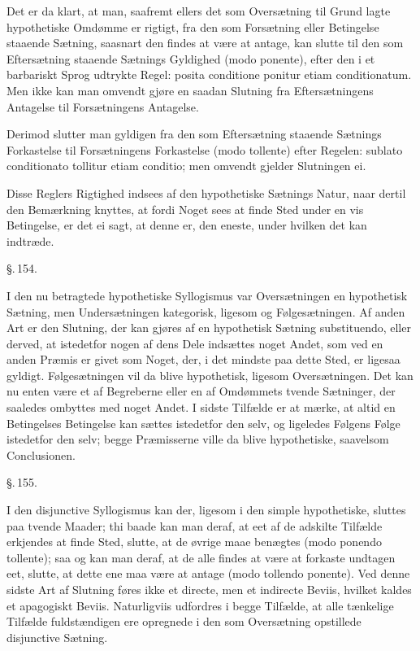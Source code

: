 \documentclass[12pt]{book}
\def\textit#1{#1}%
\newcommand{\parag}[1]{%
  \par\vspace{0.9\baselineskip}%
  {\centering\textit{\S.\,#1.}\par}%
  \vspace{0.35\baselineskip}%
  \noindent\hspace{\parindent}\ignorespaces
}
\newcommand{\opage}[1]{\marginnote{\footnotesize\textit{[#1]}}}
\begin{document}
Det er da klart, at man, saafremt ellers det som Oversætning til Grund lagte
hypothetiske Omdømme er rigtigt, fra den som Forsætning eller Betingelse
staaende Sætning, saasnart den findes at være at antage, kan slutte til den som
Eftersætning staaende Sætnings Gyldighed (\textit{modo ponente}), efter den i
et barbariskt Sprog
\opage{346} udtrykte Regel: \textit{posita conditione ponitur etiam conditionatum}. Men
ikke kan man omvendt gjøre en saadan Slutning fra Eftersætningens Antagelse til
Forsætningens Antagelse.

Derimod slutter man gyldigen fra den som Eftersætning staaende Sætnings
Forkastelse til Forsætningens Forkastelse (\textit{modo tollente}) efter
Regelen: \textit{sublato conditionato tollitur etiam conditio}; men omvendt
gjelder Slutningen ei.

Disse Reglers Rigtighed indsees af den hypothetiske Sætnings Natur, naar dertil
den Bemærkning knyttes, at fordi Noget sees at finde Sted under en vis
Betingelse, er det ei sagt, at denne er, den eneste, under hvilken det kan
indtræde.

\parag{154}

I den nu betragtede hypothetiske Syllogismus var Oversætningen en hypothetisk
Sætning, men Undersætningen kategorisk, ligesom og Følgesætningen. Af anden Art
er den Slutning, der kan gjøres af en hypothetisk Sætning
\textit{substituendo}, eller derved, at istedetfor nogen af dens Dele indsættes
noget Andet, som ved en anden Præmis er givet som Noget, der, i det mindste paa
dette Sted, er ligesaa gyldigt. Følgesætningen vil da blive hypothetisk,
ligesom Oversætningen. Det kan nu enten være et af Begreberne eller en af
Omdømmets tvende Sætninger, der saaledes ombyttes med noget Andet. I sidste
Tilfælde er at mærke, at altid en Betingelses Betingelse kan sættes istedetfor
den selv,
\opage{347} og ligeledes Følgens Følge istedetfor den selv; begge Præmisserne ville da
blive hypothetiske, saavelsom Conclusionen.

\parag{155}

I den disjunctive Syllogismus kan der, ligesom i den simple hypothetiske,
sluttes paa tvende Maader; thi baade kan man deraf, at eet af de adskilte
Tilfælde erkjendes at finde Sted, slutte, at de øvrige maae benægtes
(\textit{modo ponendo tollente}); saa og kan man deraf, at de alle findes at
være at forkaste undtagen eet, slutte, at dette ene maa være at antage
(\textit{modo tollendo ponente}). Ved denne sidste Art af Slutning føres ikke
et \textit{directe}, men et \textit{indirecte} Beviis, hvilket kaldes et
\textit{apagogiskt} Beviis. Naturligviis udfordres i begge Tilfælde, at alle
tænkelige Tilfælde fuldstændigen ere opregnede i den som Oversætning opstillede
disjunctive Sætning.
\end{document}
